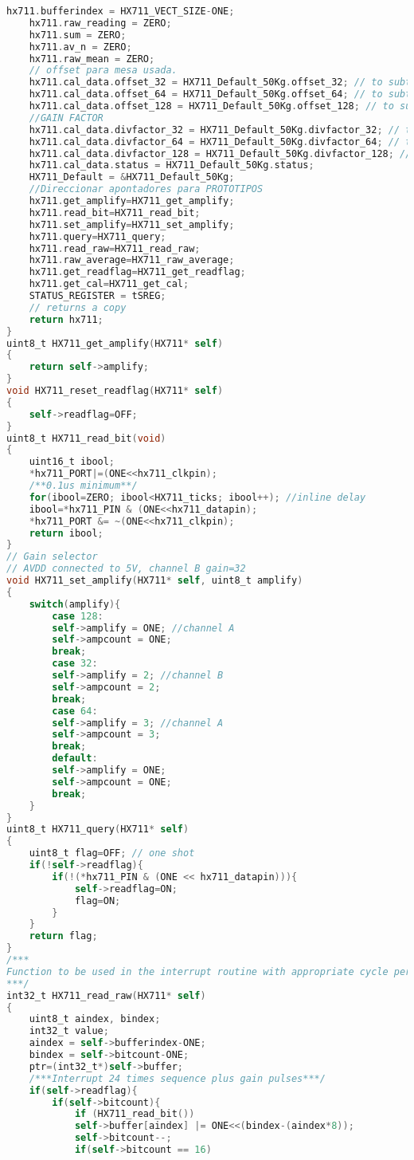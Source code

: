 \begin{lstlisting}[language=C, caption={hx711.c}, label=hx711-c, captionpos=b]
	hx711.bufferindex = HX711_VECT_SIZE-ONE;
	hx711.raw_reading = ZERO;
	hx711.sum = ZERO;
	hx711.av_n = ZERO;
	hx711.raw_mean = ZERO;
	// offset para mesa usada.
	hx711.cal_data.offset_32 = HX711_Default_50Kg.offset_32; // to subtract B
	hx711.cal_data.offset_64 = HX711_Default_50Kg.offset_64; // to subtract A 64
	hx711.cal_data.offset_128 = HX711_Default_50Kg.offset_128; // to subtract A 128
	//GAIN FACTOR
	hx711.cal_data.divfactor_32 = HX711_Default_50Kg.divfactor_32; // to divide
	hx711.cal_data.divfactor_64 = HX711_Default_50Kg.divfactor_64; // to divide
	hx711.cal_data.divfactor_128 = HX711_Default_50Kg.divfactor_128; // to divide
	hx711.cal_data.status = HX711_Default_50Kg.status;
	HX711_Default = &HX711_Default_50Kg;
	//Direccionar apontadores para PROTOTIPOS
	hx711.get_amplify=HX711_get_amplify;
	hx711.read_bit=HX711_read_bit;
	hx711.set_amplify=HX711_set_amplify;
	hx711.query=HX711_query;
	hx711.read_raw=HX711_read_raw;
	hx711.raw_average=HX711_raw_average;
	hx711.get_readflag=HX711_get_readflag;
	hx711.get_cal=HX711_get_cal;
	STATUS_REGISTER = tSREG;
	// returns a copy
	return hx711;
}
uint8_t HX711_get_amplify(HX711* self)
{
	return self->amplify;
}
void HX711_reset_readflag(HX711* self)
{
	self->readflag=OFF;
}
uint8_t HX711_read_bit(void)
{	
	uint16_t ibool;
	*hx711_PORT|=(ONE<<hx711_clkpin);
	/**0.1us minimum**/
	for(ibool=ZERO; ibool<HX711_ticks; ibool++); //inline delay
	ibool=*hx711_PIN & (ONE<<hx711_datapin);
	*hx711_PORT &= ~(ONE<<hx711_clkpin);
	return ibool;
}
// Gain selector
// AVDD connected to 5V, channel B gain=32
void HX711_set_amplify(HX711* self, uint8_t amplify)
{
	switch(amplify){
		case 128:
		self->amplify = ONE; //channel A
		self->ampcount = ONE;
		break;
		case 32:
		self->amplify = 2; //channel B
		self->ampcount = 2; 
		break;
		case 64:
		self->amplify = 3; //channel A
		self->ampcount = 3;
		break;
		default:
		self->amplify = ONE;
		self->ampcount = ONE;
		break;
	}
}
uint8_t HX711_query(HX711* self)
{
	uint8_t flag=OFF; // one shot
	if(!self->readflag){
		if(!(*hx711_PIN & (ONE << hx711_datapin))){
			self->readflag=ON;
			flag=ON;
		}
	}
	return flag;
}
/***
Function to be used in the interrupt routine with appropriate cycle period.
***/
int32_t HX711_read_raw(HX711* self)
{
	uint8_t aindex, bindex;
	int32_t value;
	aindex = self->bufferindex-ONE;
	bindex = self->bitcount-ONE;
	ptr=(int32_t*)self->buffer;
	/***Interrupt 24 times sequence plus gain pulses***/
	if(self->readflag){
		if(self->bitcount){
			if (HX711_read_bit())
			self->buffer[aindex] |= ONE<<(bindex-(aindex*8));
			self->bitcount--;
			if(self->bitcount == 16)

\end{lstlisting}
